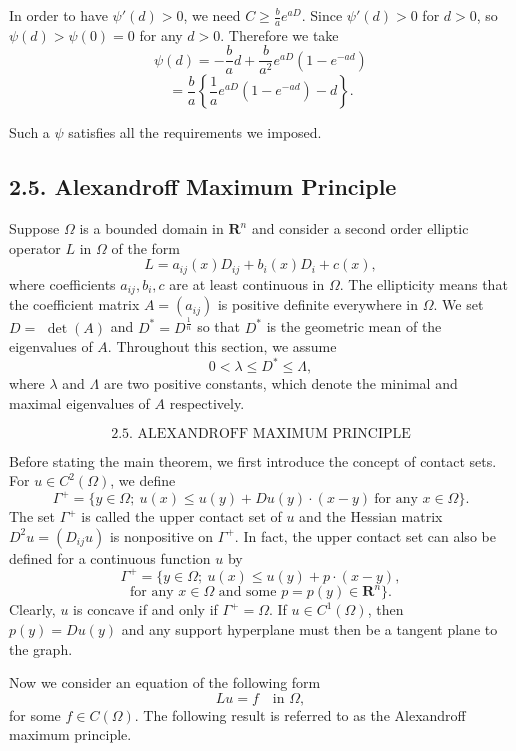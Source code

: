 In order to have \(\psi'(d) > 0\), we need \(C \geq \frac{b}{a}e^{aD}\). Since \(\psi'(d) > 0\) for \(d > 0\), so
\(\psi(d) > \psi(0) = 0\) for any \(d > 0\). Therefore we take
\[
\psi(d) = -\frac{b}{a}d + \frac{b}{a^2}e^{aD}(1 - e^{-ad})
\]
\[
= \frac{b}{a}\left\{\frac{1}{a}e^{aD}(1 - e^{-ad}) - d\right\}.
\]

Such a \(\psi\) satisfies all the requirements we imposed.

\subsection*{2.5. Alexandroff Maximum Principle}

Suppose \(\Omega\) is a bounded domain in \(\mathbf{R}^n\) and consider a second order elliptic
operator \(L\) in \(\Omega\) of the form
\[
L = a_{ij}(x)D_{ij} + b_i(x)D_i + c(x),
\]
where coefficients \(a_{ij}, b_i, c\) are at least continuous in \(\Omega\). The ellipticity means that
the coefficient matrix \(A = (a_{ij})\) is positive definite everywhere in \(\Omega\). We set \(D =\)
\(\det(A)\) and \(D^* = D^{\frac{1}{n}}\) so that \(D^*\) is the geometric mean of the eigenvalues of \(A\).
Throughout this section, we assume
\[
0 < \lambda \leq D^* \leq \Lambda,
\]
where \(\lambda\) and \(\Lambda\) are two positive constants, which denote the minimal and maximal
eigenvalues of \(A\) respectively.

\[
\text{2.5. ALEXANDROFF MAXIMUM PRINCIPLE}
\]

Before stating the main theorem, we first introduce the concept of contact sets.
For $u \in C^2(\Omega)$, we define
\[
\Gamma^+ = \{y \in \Omega;\ u(x) \le u(y) + Du(y)\cdot (x-y)\ \text{for any } x \in \Omega\}.
\]
The set $\Gamma^+$ is called the upper contact set of $u$ and the Hessian matrix
$D^2u = (D_{ij}u)$ is nonpositive on $\Gamma^+$. In fact, the upper contact set
can also be defined for a continuous function $u$ by
\[
\Gamma^+ = \{y \in \Omega;\ u(x) \le u(y) + p\cdot (x-y),
\]
\[
\text{for any } x \in \Omega \text{ and some } p = p(y) \in \mathbf{R}^n\}.
\]
Clearly, $u$ is concave if and only if $\Gamma^+ = \Omega$. If $u \in C^1(\Omega)$,
then $p(y) = Du(y)$ and any support hyperplane must then be a tangent plane to
the graph.

Now we consider an equation of the following form
\[
Lu = f \quad \text{in } \Omega,
\]
for some $f \in C(\Omega)$. The following result is referred to as the Alexandroff
maximum principle.


